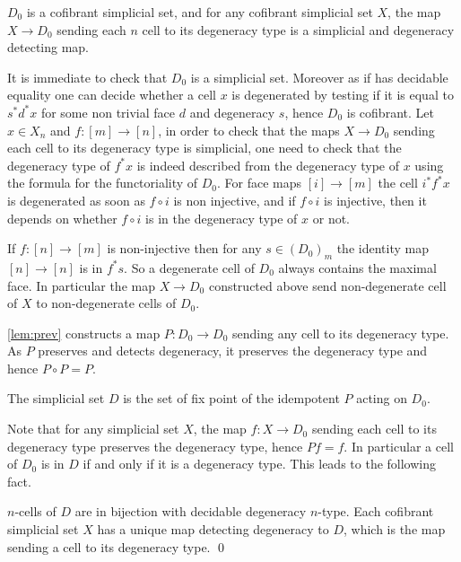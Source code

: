 \documentclass[reqno,10pt,a4paper,oneside]{amsart}
\makeatletter
\renewenvironment{proof}[1][\proofname] {\par\pushQED{\qed}\normalfont\topsep6\p@\@plus6\p@\relax\trivlist\item[\hskip\labelsep\bf#1\@addpunct{.}]\ignorespaces}{\popQED\endtrivlist\@endpefalse}
\numberwithin{equation}{section}
\theoremstyle{mythm}
\theoremstyle{mydef}
\theoremstyle{myrmk}
\newcommand{\co}{\colon}
\makeatother
\begin{document}
\begin{lemma} \label{lem:prev}
$D_0$ is a cofibrant simplicial set, and for any cofibrant simplicial set $X$, the map $X \rightarrow D_0$ sending each $n$ cell to its degeneracy type is a simplicial and degeneracy detecting map.
\end{lemma}

\begin{proof}
It is immediate to check that $D_0$ is a simplicial set. Moreover as if has decidable equality one can decide whether a cell $x$ is degenerated by testing if it is equal to $s^* d^* x$ for some non trivial face $d$ and degeneracy $s$, hence $D_0$ is cofibrant. Let $x \in X_n$ and $f:[m] \rightarrow [n]$, in order to check that the maps $X \rightarrow D_0$ sending each cell to its degeneracy type is simplicial, one need to check that the degeneracy type of $f^* x$ is indeed described from the degeneracy type of $x$ using the formula for the functoriality of $D_0$. For face maps $[i] \rightarrow [m]$ the cell $i^* f^* x$ is degenerated as soon as $f \circ i$ is non injective, and if $f\circ i$ is injective, then it depends on whether $f \circ i$ is in the degeneracy type of $x$ or not.

If $f:[n] \rightarrow [m]$ is non-injective then for any $s \in (D_0)_m$ the identity map $[n] \rightarrow [n]$ is in $f^* s$. So a degenerate cell of $D_0$ always contains the maximal face. In particular the map $X \rightarrow D_0$ constructed above send non-degenerate cell of $X$ to non-degenerate cells of $D_0$.
\end{proof}

\cref{lem:prev} constructs a map $P \co D_0 \rightarrow D_0$ sending any cell to its degeneracy type. As $P$ preserves and detects degeneracy, it preserves the degeneracy type and hence $P \circ P =P$.

\begin{definition}
The simplicial set $D$ is the set of fix point of the idempotent $P$ acting on $D_0$.
\end{definition}

Note that for any simplicial set $X$, the map $f:X \rightarrow D_0$ sending each cell to its degeneracy type preserves the degeneracy type, hence $P f = f$. In particular a cell of $D_0$ is in $D$ if and only if it is a degeneracy type. This leads to the following fact. 

\begin{lemma}
$n$-cells of $D$ are in bijection with decidable degeneracy $n$-type. Each cofibrant simplicial set $X$ has a unique map detecting degeneracy to $D$, which is the map sending a cell to its degeneracy type. \qed
\end{lemma}
\end{document}

